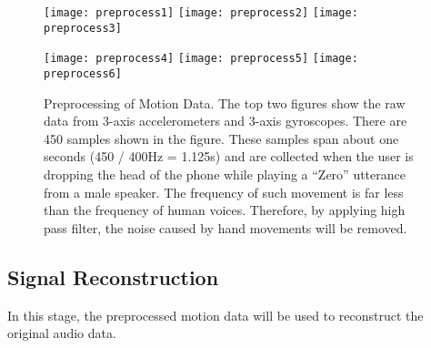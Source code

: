 \begin{figure}[H]
	\begin{minipage}[t]{.45\linewidth}
		\centering
		\texttt{[image: preprocess1]}
		\texttt{[image: preprocess2]}
		\vspace{-.2in}
		\label{fig:rawmotion}
		\vspace{.2in}
		\texttt{[image: preprocess3]}
		\vspace{-.2in}
		\label{fig:rawspec}
	\end{minipage}
	\begin{minipage}[t]{.05\linewidth}
		\quad
	\end{minipage}
	\begin{minipage}[t]{.45\linewidth}
		\centering
		\texttt{[image: preprocess4]}
		\vspace{-.2in}
		\label{fig:newspec}
		\vspace{.2in}
		\texttt{[image: preprocess5]}
		\texttt{[image: preprocess6]}
		\vspace{-.2in}
		\label{fig:newmotion}
	\end{minipage}
	
	\caption[Preprocessing of Motion Data. ]{Preprocessing of Motion Data. The top two figures show the raw data from 3-axis accelerometers and 3-axis gyroscopes. There are 450 samples shown in the figure. These samples span about one seconds (450 / 400Hz = 1.125s) and are collected when the user is  dropping the head of the phone while playing a ``Zero'' utterance from a male speaker. The frequency of such movement is far less than the frequency of human voices. Therefore, by applying high pass filter, the noise caused by hand movements will be removed. }
	
	\label{fig:spyphonepreprocess}
\end{figure}


\subsection{Signal Reconstruction}
In this stage, the preprocessed motion data will be used to reconstruct the original audio data.


